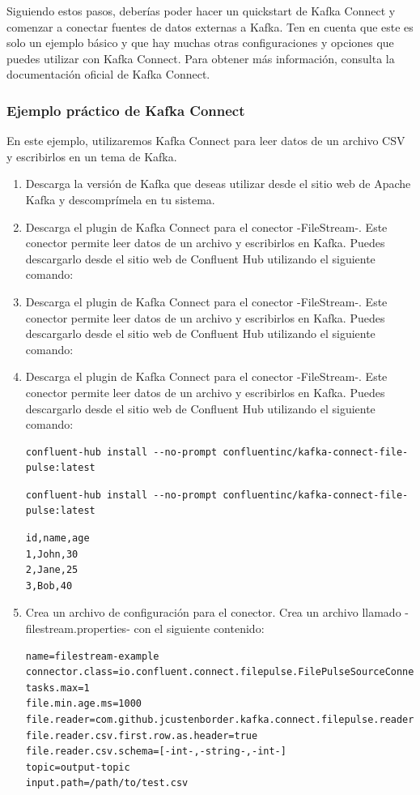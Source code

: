 \documentclass{article}
\begin{document}
Siguiendo estos pasos, deberías poder hacer un quickstart de Kafka Connect y comenzar a conectar fuentes de datos externas a Kafka. Ten en cuenta que este es solo un ejemplo básico y que hay muchas otras configuraciones y opciones que puedes utilizar con Kafka Connect. Para obtener más información, consulta la documentación oficial de Kafka Connect.

\subsubsection{Ejemplo práctico de Kafka Connect}

En este ejemplo, utilizaremos Kafka Connect para leer datos de un archivo CSV y escribirlos en un tema de Kafka.

\begin{enumerate}
\item Descarga la versión de Kafka que deseas utilizar desde el sitio web de Apache Kafka y descomprímela en tu sistema.
\item Descarga el plugin de Kafka Connect para el conector -FileStream-. Este conector permite leer datos de un archivo y escribirlos en Kafka. Puedes descargarlo desde el sitio web de Confluent Hub utilizando el siguiente comando:
\item Descarga el plugin de Kafka Connect para el conector -FileStream-. Este conector permite leer datos de un archivo y escribirlos en Kafka. Puedes descargarlo desde el sitio web de Confluent Hub utilizando el siguiente comando:
\item Descarga el plugin de Kafka Connect para el conector -FileStream-. Este conector permite leer datos de un archivo y escribirlos en Kafka. Puedes descargarlo desde el sitio web de Confluent Hub utilizando el siguiente comando:
\begin{lstlisting}[numbers=none]
confluent-hub install --no-prompt confluentinc/kafka-connect-file-pulse:latest
\end{lstlisting}
\begin{lstlisting}[numbers=none]
confluent-hub install --no-prompt confluentinc/kafka-connect-file-pulse:latest
\end{lstlisting}
\begin{lstlisting}[numbers=none]
id,name,age
1,John,30
2,Jane,25
3,Bob,40
\end{lstlisting}
\item Crea un archivo de configuración para el conector. Crea un archivo llamado -filestream.properties- con el siguiente contenido:
\begin{lstlisting}[numbers=none]
name=filestream-example
connector.class=io.confluent.connect.filepulse.FilePulseSourceConnector
tasks.max=1
file.min.age.ms=1000
file.reader=com.github.jcustenborder.kafka.connect.filepulse.reader.CsvFileInputReader
file.reader.csv.first.row.as.header=true
file.reader.csv.schema=[-int-,-string-,-int-]
topic=output-topic
input.path=/path/to/test.csv
\end{lstlisting}


\end{enumerate}
\end{document}
